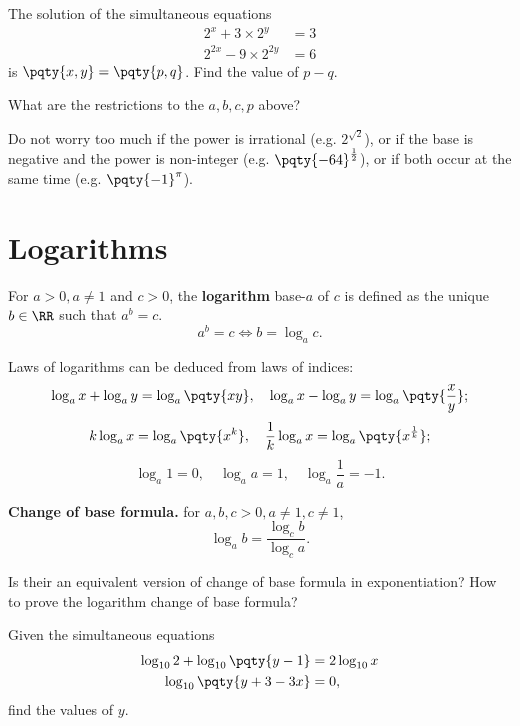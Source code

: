 \documentclass{article}
\begin{document}
\begin{example}[TMUA 2017 P1 Q14]
    The solution of the simultaneous equations
    \begin{align*}
        2^x + 3 \times 2^y &= 3 \\
        2^{2x} - 9 \times 2^{2y} &= 6
    \end{align*}
    is \(\pqty{x, y} = \pqty{p, q}\). Find the value of \(p - q\).
\end{example}

\begin{problem}
    What are the restrictions to the \(a, b, c, p\) above?
\end{problem}

Do not worry too much if the power is irrational (e.g. \(2^{\sqrt{2}}\)), or if the base is negative and the power is non-integer (e.g. \(\pqty{-64}^{\frac{1}{2}}\)), or if both occur at the same time (e.g. \(\pqty{-1}^{\pi}\)).

\section{Logarithms}

For \(a > 0, a \neq 1\) and \(c > 0\), the \textbf{logarithm} base-\(a\) of \(c\) is defined as the unique \(b \in \RR\) such that \(a^b = c\).
\[
    a^b = c \iff b = \log_a c.
\]  

Laws of logarithms can be deduced from laws of indices:
\[
    \log_a x + \log_a y = \log_a \pqty{xy}, \quad \log_a x - \log_a y = \log_a \pqty{\frac{x}{y}};
\]
\[
    k \log_a x = \log_a \pqty{x^k}, \quad \frac{1}{k} \log_a x = \log_a \pqty{x^{\frac{1}{k}}};
\]
\[
    \log_a 1 = 0, \quad \log_a a = 1, \quad \log_a \frac{1}{a} = -1.
\]

\textbf{Change of base formula.} for \(a, b, c > 0, a \neq 1, c \neq 1\),
\[
    \log_a b = \frac{\log_c b}{\log_c a}.
\]

\begin{problem}
    Is their an equivalent version of change of base formula in exponentiation? How to prove the logarithm change of base formula?
\end{problem}

\begin{example}[TMUA 2016 P1 Q16]
    Given the simultaneous equations
    \begin{align*}
        \log_{10} 2 + \log_{10} \pqty{y - 1} &= 2 \log_{10} x \\
        \log_{10} \pqty{y + 3 - 3x} &= 0,
    \end{align*}
    find the values of \(y\).
\end{example}
\end{document}
